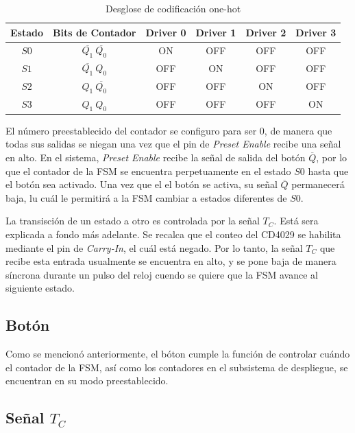 \documentclass[12pt,onecolumn]{IEEEtran}
\begin{document}
\begin{table}[H]
\centering
\caption{Desglose de codificación one-hot}
\label{tab:Drivers/Estados}
\begin{tabular}{cccccc}
\toprule
\textbf{Estado} & \textbf{Bits de Contador} & \textbf{Driver 0} & \textbf{Driver 1} & \textbf{Driver 2} & \textbf{Driver 3}\\
\midrule
$S0$ & $\overline{Q_1}~ \overline{Q_0}$ & ON & OFF & OFF & OFF \\
$S1$ & $\overline{Q_1} ~Q_0$ & OFF & ON & OFF & OFF \\
$S2$ & $Q_1 ~\overline{Q_0}$ & OFF & OFF & ON & OFF \\
$S3$ & $Q_1 ~Q_0$ & OFF & OFF & OFF & ON \\
\bottomrule
\end{tabular}
\end{table}


El número preestablecido del contador se configuro para ser 0, de manera que todas sus salidas se niegan una vez que el pin de \textit{Preset Enable} recibe una señal en alto. En el sistema, \textit{Preset Enable} recibe la señal de salida del botón $\overline{Q}$, por lo que el contador de la FSM se encuentra perpetuamente en el estado $S0$ hasta que el botón sea activado. Una vez que el el botón se activa, su señal $\overline{Q}$ permanecerá baja, lu cuál le permitirá a la FSM cambiar a estados diferentes de $S0$.


La transisción de un estado a otro es controlada por la señal $T_C$. Está sera explicada a fondo más adelante. Se recalca que el conteo del CD4029 se habilita mediante el pin de \textit{Carry-In}, el cuál está negado. Por lo tanto, la señal $T_C$ que recibe esta entrada usualmente se encuentra en alto, y se pone baja de manera síncrona durante un pulso del reloj cuendo se quiere que la FSM avance al siguiente estado. 

\subsection{Botón}

Como se mencionó anteriormente, el bóton cumple la función de controlar cuándo el contador de la FSM, así como los contadores en el subsistema de despliegue, se encuentran en su modo preestablecido. 

\subsection{Señal $T_C$}
\end{document}

